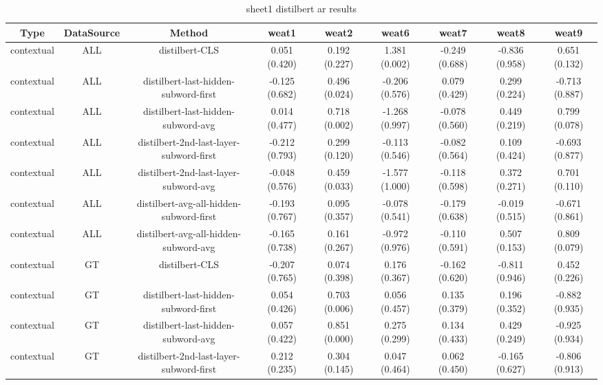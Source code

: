 \begin{sidewaystable}[htb]
    \centering
    \caption{sheet1 distilbert ar results}
    \label{appendix_tab:sheet1_distilbert_ar_results}
    \small
    \begin{tabular}{@{}ccccccccc@{}}
        \toprule
        Type & DataSource & Method & weat1 & weat2 & weat6 & weat7 & weat8 & weat9 \\
        \midrule
        contextual & ALL & distilbert-CLS & 0.051 (0.420) & 0.192 (0.227) & 1.381 (0.002) & -0.249 (0.688) & -0.836 (0.958) & 0.651 (0.132) \\
        contextual & ALL & distilbert-last-hidden-subword-first & -0.125 (0.682) & 0.496 (0.024) & -0.206 (0.576) & 0.079 (0.429) & 0.299 (0.224) & -0.713 (0.887) \\
        contextual & ALL & distilbert-last-hidden-subword-avg & 0.014 (0.477) & 0.718 (0.002) & -1.268 (0.997) & -0.078 (0.560) & 0.449 (0.219) & 0.799 (0.078) \\
        contextual & ALL & distilbert-2nd-last-layer-subword-first & -0.212 (0.793) & 0.299 (0.120) & -0.113 (0.546) & -0.082 (0.564) & 0.109 (0.424) & -0.693 (0.877) \\
        contextual & ALL & distilbert-2nd-last-layer-subword-avg & -0.048 (0.576) & 0.459 (0.033) & -1.577 (1.000) & -0.118 (0.598) & 0.372 (0.271) & 0.701 (0.110) \\
        contextual & ALL & distilbert-avg-all-hidden-subword-first & -0.193 (0.767) & 0.095 (0.357) & -0.078 (0.541) & -0.179 (0.638) & -0.019 (0.515) & -0.671 (0.861) \\
        contextual & ALL & distilbert-avg-all-hidden-subword-avg & -0.165 (0.738) & 0.161 (0.267) & -0.972 (0.976) & -0.110 (0.591) & 0.507 (0.153) & 0.809 (0.079) \\
        contextual & GT & distilbert-CLS & -0.207 (0.765) & 0.074 (0.398) & 0.176 (0.367) & -0.162 (0.620) & -0.811 (0.946) & 0.452 (0.226) \\
        contextual & GT & distilbert-last-hidden-subword-first & 0.054 (0.426) & 0.703 (0.006) & 0.056 (0.457) & 0.135 (0.379) & 0.196 (0.352) & -0.882 (0.935) \\
        contextual & GT & distilbert-last-hidden-subword-avg & 0.057 (0.422) & 0.851 (0.000) & 0.275 (0.299) & 0.134 (0.433) & 0.429 (0.249) & -0.925 (0.934) \\
        contextual & GT & distilbert-2nd-last-layer-subword-first & 0.212 (0.235) & 0.304 (0.145) & 0.047 (0.464) & 0.062 (0.450) & -0.165 (0.627) & -0.806 (0.913) \\

\end{tabular}
\end{sidewaystable}
